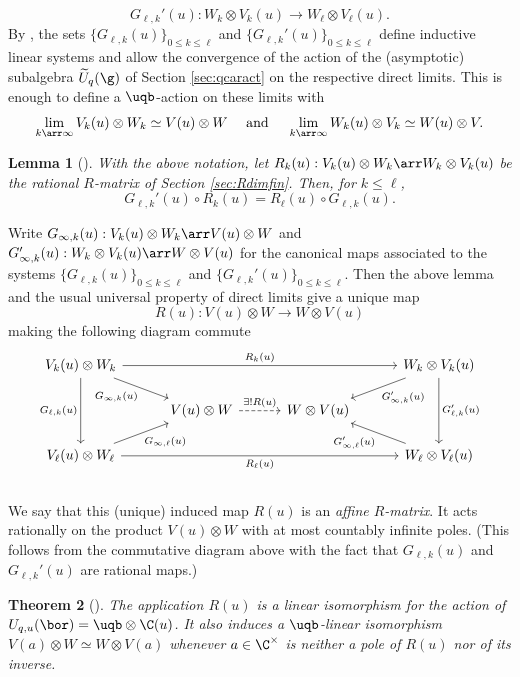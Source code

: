 \documentclass[11pt]{amsart}
\newtheorem{theorem}{Theorem}[section]
\newtheorem{lem}[theorem]{Lemma}
\theoremstyle{definition}
\theoremstyle{remark}
\numberwithin{equation}{section}
\begin{document}
$$ G_{\ell,k}'(u) : W_k\otimes V_k(u) \rightarrow W_{\ell} \otimes V_{\ell}(u). $$
By \cite[Section 5]{her}, the sets $\{G_{\ell,k}(u)\}_{0\leq k\leq \ell}$ and $\{G_{\ell,k}'(u)\}_{0\leq k\leq \ell}$ define inductive linear systems and allow the convergence of the action of the (asymptotic) subalgebra $\widetilde{U}_q(\g)$ of Section \ref{sec:qcaract} on the respective direct limits. This is enough to define a $\uqb$-action on these limits with
$$ \lim_{k \arr \infty} V_k(u)\otimes W_k \simeq V(u)\otimes W \quad \text{ and }\quad \lim_{k \arr \infty} W_k(u)\otimes V_k \simeq W(u)\otimes V.$$
\begin{lem}[{\cite[Section 5]{her}}]\label{lemma:IndRkOm} With the above notation, let $R_k(u):V_k(u)\otimes W_k \arr W_k\otimes V_k(u)$ be the rational $R$-matrix of Section \ref{sec:Rdimfin}. Then, for $k\leq \ell$,
$$ G_{\ell,k}'(u) \circ R_k(u) = R_{\ell}(u)\circ G_{\ell,k}(u). $$
\end{lem}
Write $G_{\infty,k}(u) : V_k(u)\otimes W_k \arr V(u)\otimes W$ and $G_{\infty,k}'(u):W_k\otimes V_k(u)\arr W \otimes V(u)$ for the canonical maps associated to the systems $\{G_{\ell,k}(u)\}_{0\leq k\leq \ell}$ and $\{G_{\ell,k}'(u)\}_{0\leq k\leq \ell}$. Then the above lemma and the usual universal property of direct limits give a unique map $$R(u) : V(u)\otimes W \rightarrow W\otimes V(u)$$ making the following diagram commute \\[-2.25mm]
\begin{equation}\label{eq:CommDiagRmat}
\begin{tikzcd}[row sep = 1.5em, column sep = 3em]
V_k(u)\otimes W_k \arrow[dd,"G_{\ell,k}(u)",swap]\arrow[rrr,"R_k(u)"]\arrow[dr,"G_{\infty,k}(u)",swap] & & & W_k\otimes V_k(u)\arrow[dd,"G_{\ell,k}'(u)"]\arrow[dl,"G_{\infty,k}'(u)"]\\
& V(u)\otimes W\arrow[r,dashed,"\exists! R(u)"] & W \otimes V(u) & \\
V_{\ell}(u)\otimes W_{\ell}\arrow[rrr,"R_{\ell}(u)",swap]\arrow[ur,"G_{\infty,\ell}(u)",swap] & & & W_{\ell}\otimes V_{\ell}(u)\arrow[ul,"G_{\infty,\ell}'(u)"]
\end{tikzcd}
\end{equation}\\[-0.5mm]
We say that this (unique) induced map $R(u)$ is an \textit{affine $R$-matrix}. It acts rationally on the product $V(u)\otimes W$ with at most countably infinite poles. (This follows from the commutative diagram above with the fact that $G_{\ell,k}(u)$ and $G_{\ell,k}'(u)$ are rational maps.)
\begin{theorem}[{\cite[Section 5]{her}}]\label{thm:ROmLin}
The application $R(u)$ is a linear isomorphism for the action of $U_{q,u}(\bor) = \uqb\otimes \C(u)$. It also induces a $\uqb$-linear isomorphism $V(a)\otimes W \simeq W\otimes V(a)$ whenever $a\in \C^{\times}$ is neither a pole of $R(u)$ nor of its inverse.
\end{theorem}
\end{document}
